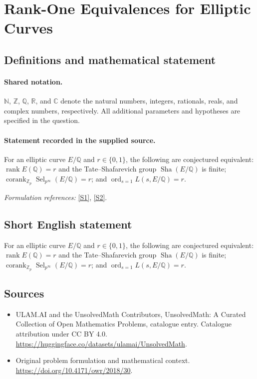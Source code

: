 \documentclass[11pt]{article}
\newcommand{\sref}[2]{\hyperlink{source:#1:#2}{[S#2]}}
\begin{document}
\section{Rank-One Equivalences for Elliptic Curves}\label{statement}

\subsection{Definitions and mathematical statement}

\paragraph{Shared notation.}$\mathbb N$, $\mathbb Z$, $\mathbb Q$, $\mathbb R$, and $\mathbb C$ denote the natural numbers, integers, rationals, reals, and complex numbers, respectively. All additional parameters and hypotheses are specified in the question.


\paragraph{Statement recorded in the supplied source.}
For an elliptic curve $E/\mathbb{Q}$ and $r\in\{0,1\}$, the following are conjectured equivalent: $\operatorname{rank}E(\mathbb{Q})=r$ and the Tate–Shafarevich group $\operatorname{Sha}(E/\mathbb{Q})$ is finite; $\operatorname{corank}_{\mathbb{Z}_p}\operatorname{Sel}_{p^\infty}(E/\mathbb{Q})=r$; and $\operatorname{ord}_{s=1}L(s,E/\mathbb{Q})=r$.
\par\smallskip\textit{Formulation references:} \sref{statement}{1}, \sref{statement}{2}.
\subsection{Short English statement}
For an elliptic curve $E/\mathbb{Q}$ and $r\in\{0,1\}$, the following are conjectured equivalent: $\operatorname{rank}E(\mathbb{Q})=r$ and the Tate–Shafarevich group $\operatorname{Sha}(E/\mathbb{Q})$ is finite; $\operatorname{corank}_{\mathbb{Z}_p}\operatorname{Sel}_{p^\infty}(E/\mathbb{Q})=r$; and $\operatorname{ord}_{s=1}L(s,E/\mathbb{Q})=r$.
\subsection{Sources}
\begin{itemize}
\item[\hypertarget{source:statement:1}{S1}] ULAM.AI and the UnsolvedMath Contributors, UnsolvedMath: A Curated Collection of Open Mathematics Problems, catalogue entry. Catalogue attribution under CC BY 4.0.
\url{https://huggingface.co/datasets/ulamai/UnsolvedMath}.
\item[\hypertarget{source:statement:2}{S2}] Original problem formulation and mathematical context.
\url{https://doi.org/10.4171/owr/2018/30}.
\end{itemize}
\label{end:statement}
\end{document}
